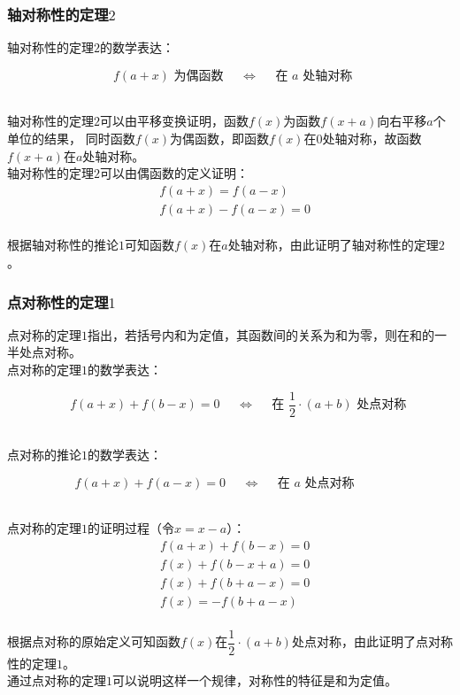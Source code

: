\documentclass[UTF8]{ctexart}
\begin{document}
\subsubsection{轴对称性的定理$2$}
    \setcounter{equation}{0}
    轴对称性的定理$2$的数学表达：
    \begin{large}
        \begin{equation*}
            ~~f(a+x)\text{~为偶函数}~~~~~~\Longleftrightarrow~~~~~~\text{在~}a\text{~处轴对称}
        \end{equation*}
    \end{large}\\
    轴对称性的定理$2$可以由平移变换证明，函数$f(x)$为函数$f(x+a)$向右平移$a$个单位的结果，
    同时函数$f(x)$为偶函数，即函数$f(x)$在$0$处轴对称，故函数$f(x+a)$在$a$处轴对称。\\[3mm]
    轴对称性的定理$2$可以由偶函数的定义证明：\vspace{5pt}
    \begin{align}
        &f(a+x)=f(a-x)\\[5mm]
        &f(a+x)-f(a-x)=0
    \end{align}\\
    根据轴对称性的推论$1$可知函数$f(x)$在$a$处轴对称，由此证明了轴对称性的定理$2$。

\newpage

\subsubsection{点对称性的定理$1$}
    \setcounter{equation}{0}
    点对称的定理$1$指出，若括号内和为定值，其函数间的关系为和为零，则在和的一半处点对称。\\[3mm]
    点对称的定理$1$的数学表达：
    \begin{large}
        \begin{equation*}
            ~~~~~~f(a+x)+f(b-x)=0~~~~~~\Longleftrightarrow~~~~~~\text{在~}\frac{1}{2}\cdot(a+b)\text{~处点对称}
        \end{equation*}
    \end{large}\\
    点对称的推论$1$的数学表达：
    \begin{large}
        \begin{equation*}
            f(a+x)+f(a-x)=0~~~~~~\Longleftrightarrow~~~~~~\text{在~}a\text{~处点对称}\hspace{30pt}
        \end{equation*}
    \end{large}\\
    点对称的定理$1$的证明过程（令$x=x-a$）：
    \begin{align}
        &f(a+x)+f(b-x)=0\\[5mm]
        &f(x)+f(b-x+a)=0\\[5mm]
        &f(x)+f(b+a-x)=0\\[5mm]
        &f(x)=-f(b+a-x)
    \end{align}\\
    根据点对称的原始定义可知函数$f(x)$在$\dfrac{1}{2}\cdot(a+b)$处点对称，由此证明了点对称性的定理$1$。\\[3mm]
    通过点对称的定理$1$可以说明这样一个规律，对称性的特征是和为定值。\vspace{5pt}
\end{document}
